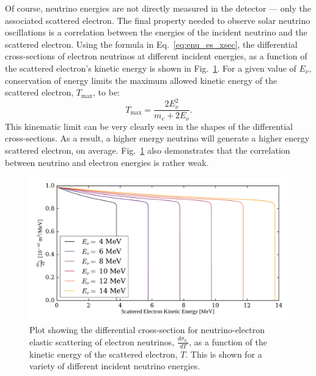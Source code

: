 Of course, neutrino energies are not directly measured in the detector --- only the associated scattered electron. The final property needed to observe solar neutrino oscillations is a correlation between the energies of the incident neutrino and the scattered electron. Using the formula in Eq.~\ref{eq:enu_es_xsec}, the differential cross-sections of electron neutrinos at different incident energies, as a function of the scattered electron's kinetic energy is shown in Fig.~\ref{fig:nu_elec_energy_dependence}. For a given value of $E_{\nu}$, conservation of energy limits the maximum allowed kinetic energy of the scattered electron, $T_{\mathrm{max}}$, to be:
\begin{equation}
    T_{\mathrm{max}} = \frac{2E_{\nu}^{2}}{m_{e}+2E_{\nu}}.
\end{equation}
This kinematic limit can be very clearly seen in the shapes of the differential cross-sections. As a result, a higher energy neutrino will generate a higher energy scattered electron, on average. Fig.~\ref{fig:nu_elec_energy_dependence} also demonstrates that the correlation between neutrino and electron energies is rather weak.

\begin{figure}[!th]
    \centering
    \includegraphics[width=\textwidth]{6_SolarAnalysis/images/neutrino_electron_elastic_scattering_diff_xsecs.pdf}
    \caption[differential cross-section for neutrino-electron elastic scattering of electron neutrinos as a function of $T$ and $E_{\nu}$]
    {Plot showing the differential cross-section for neutrino-electron elastic scattering of electron neutrinos, $\frac{d\sigma_{\nu_{e}}}{dT}$, as a function of the kinetic energy of the scattered electron, $T$. This is shown for a variety of different incident neutrino energies.}
    \label{fig:nu_elec_energy_dependence}
\end{figure}


